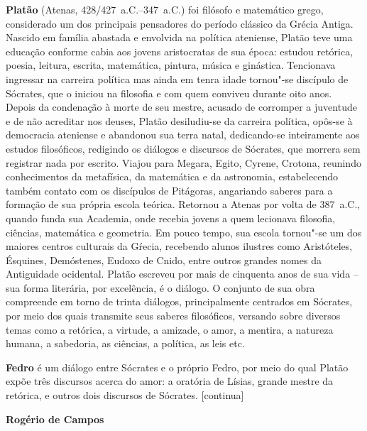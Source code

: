 
\textbf{Platão} (Atenas, 428/427~a.C.--347~a.C.) foi filósofo e matemático grego, considerado um dos principais pensadores do período clássico da Grécia Antiga. Nascido em família abastada e envolvida na política ateniense, Platão teve uma educação conforme cabia aos jovens aristocratas de sua época: estudou retórica, poesia, leitura, escrita, matemática, pintura, música e ginástica. Tencionava ingressar na carreira política mas ainda em tenra idade tornou"-se discípulo de Sócrates, que o iniciou na filosofia e com quem conviveu durante oito anos. Depois da condenação à morte de seu mestre, acusado de corromper a juventude e de não acreditar nos deuses, Platão desiludiu-se da carreira política, opôs-se à democracia ateniense e abandonou sua terra natal, dedicando-se inteiramente aos estudos filosóficos, redigindo os diálogos e discursos de Sócrates, que morrera sem registrar nada por escrito. Viajou para Megara, Egito, Cyrene, Crotona, reunindo conhecimentos da metafísica, da matemática e da astronomia, estabelecendo também contato com os discípulos de Pitágoras, angariando saberes para a formação de sua própria escola teórica. Retornou a Atenas por volta de 387~a.C., quando funda sua Academia, onde recebia jovens a quem lecionava filosofia, ciências, matemática e geometria. Em pouco tempo, sua escola tornou"-se um dos maiores centros culturais da Gŕecia, recebendo alunos ilustres como Aristóteles, Ésquines, Demóstenes, Eudoxo de Cnido, entre outros grandes nomes da Antiguidade ocidental. Platão escreveu por mais de cinquenta anos de sua vida -- sua forma literária, por excelência, é o diálogo. O conjunto de sua obra compreende em torno de trinta diálogos, principalmente centrados em Sócrates, por meio dos quais transmite seus saberes filosóficos, versando sobre diversos temas como a retórica, a virtude, a amizade, o amor, a mentira, a natureza humana, a sabedoria, as ciências, a política, as leis etc. 

\textbf{Fedro} é um diálogo entre Sócrates e o próprio Fedro, por meio do qual Platão expõe três discursos acerca do amor: a oratória de Lísias, grande mestre da retórica, e outros dois discursos de Sócrates. [continua]


\textbf{Rogério de Campos} 

